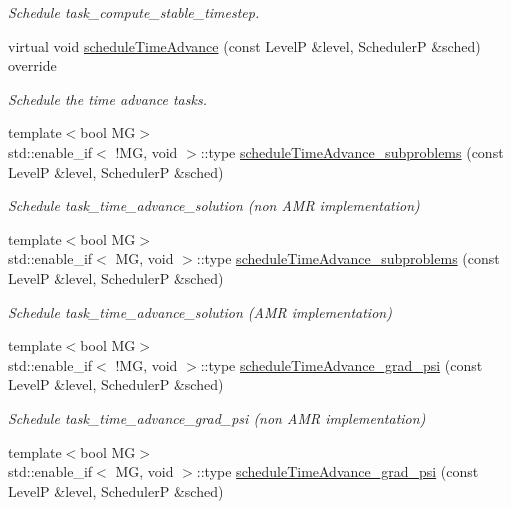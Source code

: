 \begin{DoxyCompactItemize}
\begin{DoxyCompactList}\small\item\em Schedule task\+\_\+compute\+\_\+stable\+\_\+timestep. \end{DoxyCompactList}\item 
virtual void \hyperlink{classUintah_1_1PhaseField_1_1PureMetal_a4825e0f8c5b29a746deadb9eac0a4f3a}{schedule\+Time\+Advance} (const LevelP \&level, SchedulerP \&sched) override
\begin{DoxyCompactList}\small\item\em Schedule the time advance tasks. \end{DoxyCompactList}\item 
{\footnotesize template$<$bool MG$>$ }\\std\+::enable\+\_\+if$<$ !MG, void $>$\+::type \hyperlink{classUintah_1_1PhaseField_1_1PureMetal_a343b51c59a68cb107d449d16f4857c1e}{schedule\+Time\+Advance\+\_\+subproblems} (const LevelP \&level, SchedulerP \&sched)
\begin{DoxyCompactList}\small\item\em Schedule task\+\_\+time\+\_\+advance\+\_\+solution (non A\+MR implementation) \end{DoxyCompactList}\item 
{\footnotesize template$<$bool MG$>$ }\\std\+::enable\+\_\+if$<$ MG, void $>$\+::type \hyperlink{classUintah_1_1PhaseField_1_1PureMetal_a343b51c59a68cb107d449d16f4857c1e}{schedule\+Time\+Advance\+\_\+subproblems} (const LevelP \&level, SchedulerP \&sched)
\begin{DoxyCompactList}\small\item\em Schedule task\+\_\+time\+\_\+advance\+\_\+solution (A\+MR implementation) \end{DoxyCompactList}\item 
{\footnotesize template$<$bool MG$>$ }\\std\+::enable\+\_\+if$<$ !MG, void $>$\+::type \hyperlink{classUintah_1_1PhaseField_1_1PureMetal_a4567da5b0cded42b606b75572f3b0599}{schedule\+Time\+Advance\+\_\+grad\+\_\+psi} (const LevelP \&level, SchedulerP \&sched)
\begin{DoxyCompactList}\small\item\em Schedule task\+\_\+time\+\_\+advance\+\_\+grad\+\_\+psi (non A\+MR implementation) \end{DoxyCompactList}\item 
{\footnotesize template$<$bool MG$>$ }\\std\+::enable\+\_\+if$<$ MG, void $>$\+::type \hyperlink{classUintah_1_1PhaseField_1_1PureMetal_a4567da5b0cded42b606b75572f3b0599}{schedule\+Time\+Advance\+\_\+grad\+\_\+psi} (const LevelP \&level, SchedulerP \&sched)

\end{DoxyCompactItemize}
